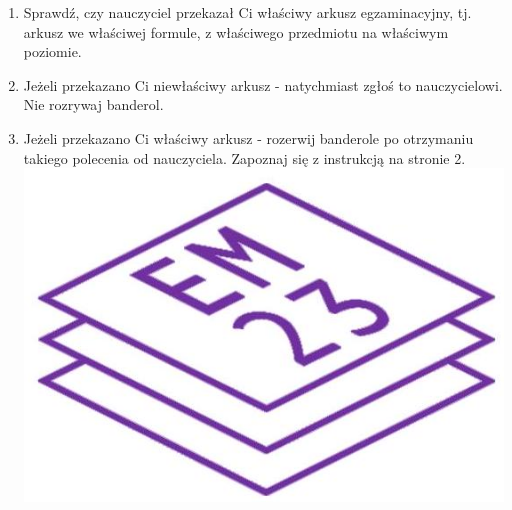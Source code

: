\documentclass[10pt]{article}
\begin{document}
\begin{enumerate}
  \item Sprawdź, czy nauczyciel przekazał Ci właściwy arkusz egzaminacyjny, tj. arkusz we właściwej formule, z właściwego przedmiotu na właściwym poziomie.
  \item Jeżeli przekazano Ci niewłaściwy arkusz - natychmiast zgłoś to nauczycielowi. Nie rozrywaj banderol.
  \item Jeżeli przekazano Ci właściwy arkusz - rozerwij banderole po otrzymaniu takiego polecenia od nauczyciela. Zapoznaj się z instrukcją na stronie 2.\\
\includegraphics[max width=\textwidth, center]{2024_11_21_51cb67544fb9b029f01cg-02}
\end{enumerate}
\end{document}
